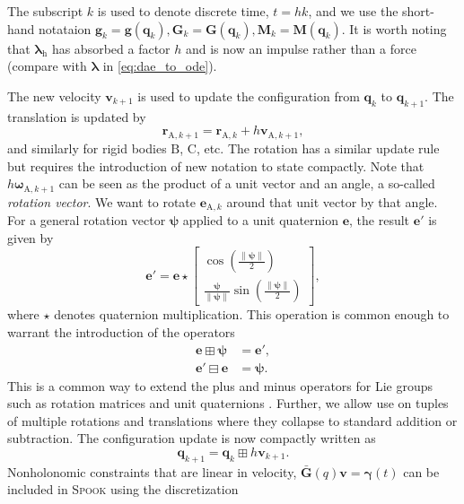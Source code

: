 \documentclass[preprint,12pt]{elsarticle}
\let\vec\bm
\let\mat\mathbf
\let\amssymbboxplus\boxplus
\let\amssymbboxminus\boxminus
\renewcommand{\boxplus}{\mathbin{\mathop\amssymbboxplus}}
\renewcommand{\boxminus}{\mathbin{\mathop\amssymbboxminus}}
\numberwithin{equation}{section}
\def\rv{\psi}
\def\quat{e}
\def\conf{q}
\def\tA{\text{A}}
\def\tB{\text{B}}
\def\lambdah{\vec{\lambda}_{\text{h}}}
\begin{document}
The subscript $k$ is used to denote discrete time, $t=hk$, and we use the short-hand notataion $\vec{g}_k = \vec{g}(\vec{\conf}_k), \mat{G}_k = \mat{G}(\vec{\conf}_k), \mat{M}_k = \mat{M}(\vec{\conf}_k)$.
It is worth noting that $\lambdah$ has absorbed a factor $h$ and is now an impulse rather than a force (compare with $\vec{\lambda}$ in \eqref{eq:dae_to_ode}).

The new velocity $\vec{v}_{k+1}$ is used to update the configuration from $\vec{q}_k$ to $\vec{q}_{k+1}$.
The translation is updated by
\begin{equation}
    \vec{r}_{\tA, {k+1}} = \vec{r}_{\tA, k} + h\vec{v}_{\tA, k+1},
\end{equation}
and similarly for rigid bodies $\tB$, $\text{C}$, etc.
The rotation has a similar update rule but requires the introduction of new notation to state compactly.
Note that $h \vec{\omega}_{\tA, k+1}$ can be seen as the product of a unit vector and an angle, a so-called \emph{rotation vector}.
We want to rotate $\vec{e}_{\tA, k}$ around that unit vector by that angle.
For a general rotation vector $\vec{\rv}$ applied to a unit quaternion $\vec{\quat}$, the result $\vec{\quat}'$ is given by
\begin{equation}
    \vec{\quat}' = 
    \vec{\quat} \star
    \begin{bmatrix}
        \cos (\frac{\|\vec{\rv}\|}{2}) \\
        \frac{\vec{\rv}}{\|\vec{\rv}\|} \sin (\frac{\|\vec{\rv}\|}{2})
    \end{bmatrix},
\end{equation}
where $\star$ denotes quaternion multiplication.
This operation is common enough to warrant the introduction of the operators
\begin{eqnarray}
    \label{eq:boxdef}
    \vec{\quat} \boxplus \vec{\rv} &= \vec{\quat}', \\
    \vec{\quat}' \boxminus \vec{\quat} &= \vec{\rv}.
\end{eqnarray}
This is a common way to extend the plus and minus operators for Lie groups such as rotation matrices and unit quaternions \cite{sola2017quaternion}.
Further, we allow use on tuples of multiple rotations and translations where they collapse to standard addition or subtraction.
The configuration update is now compactly written as
\begin{equation}
    \vec{q}_{k+1} = \vec{q}_k \boxplus h\vec{v}_{k+1}.
\end{equation}
Nonholonomic constraints that are linear in velocity, $\bar{\mat{G}}(\conf) \vec{v} = \vec{\gamma}(t)$ can be included in \textsc{Spook} using the discretization
\end{document}
